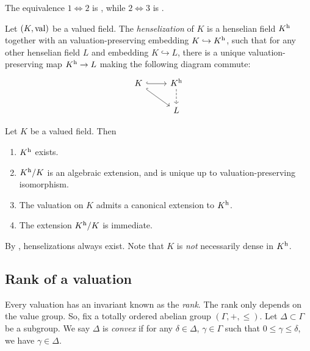 The equivalence $1\Leftrightarrow 2$ is \cite[4.1.3]{engler-prestel}, while 
$2\Leftrightarrow 3$ is \cite[I \S 1.5]{raynaud-1970}. 

\begin{definition}
Let $(K,\operatorname{val})$ be a valued field. The \emph{henselization} of $K$ is 
a henselian field $K^{\mathrm{h}}$ together with an valuation-preserving 
embedding $K\hookrightarrow K^{\mathrm{h}}$, such that for any other 
henselian field $L$ and embedding $K\hookrightarrow L$, there is a unique 
valuation-preserving map $K^{\mathrm{h}}\to L$ making the following diagram 
commute:
\[\begin{tikzcd}
  K\ar[r, hook] \ar[dr, hook]
    & K^\henselization \ar[d, dashed] \\
  & L 
\end{tikzcd}
\]
\end{definition}

\begin{proposition}
Let $K$ be a valued field. Then 
\begin{enumerate}
\item
$K^{\mathrm{h}}$ exists. 

\item
$K^{\mathrm{h}}/K$ is an algebraic extension, and is unique up to 
valuation-preserving isomorphism. 

\item
The valuation on $K$ admits a canonical extension to $K^{\mathrm{h}}$. 

\item
The extension $K^{\mathrm{h}}/K$ is immediate. 
\end{enumerate}
\end{proposition}

By \cite[5.2.2]{engler-prestel}, henselizations always exist. Note that $K$ is 
\emph{not} necessarily dense in $K^{\mathrm{h}}$. 



\subsection{Rank of a valuation}

Every valuation has an invariant known as the \emph{rank}. The rank only 
depends on the value group. So, fix a totally ordered abelian group 
$(\Gamma,+,\leqslant)$. Let $\Delta\subset \Gamma$ be a subgroup. We say 
$\Delta$ is \emph{convex} if for any $\delta\in \Delta$, $\gamma\in \Gamma$ 
such that $0\leqslant \gamma\leqslant \delta$, we have $\gamma\in \Delta$. 


